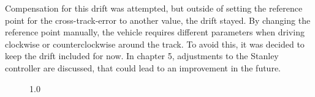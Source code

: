 \documentclass[arbeit=studie,oneside,BCOR=12mm]{ArbeitRST}
\begin{document}
Compensation for this drift was attempted, but outside of setting the reference
point for the cross-track-error to another value, the drift stayed. By changing
the reference point manually, the vehicle requires different parameters when
driving clockwise or counterclockwise around the track. To avoid this, it was
decided to keep the drift included for now. In chapter 5, adjustments to the
Stanley controller are discussed, that could lead to an improvement in the
future.

\begin{figure}[h]
    \centering
    \caption{1.0}
    \label{ausrei}
\end{figure}
\end{document}
